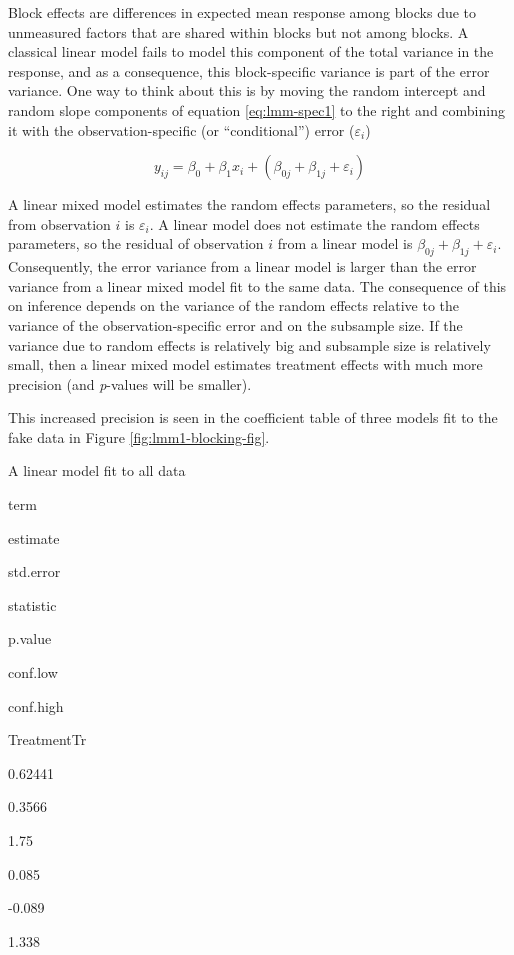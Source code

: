 \documentclass[]{book}
\begin{document}
Block effects are differences in expected mean response among blocks due to unmeasured factors that are shared within blocks but not among blocks. A classical linear model fails to model this component of the total variance in the response, and as a consequence, this block-specific variance is part of the error variance. One way to think about this is by moving the random intercept and random slope components of equation \eqref{eq:lmm-spec1} to the right and combining it with the observation-specific (or ``conditional'') error (\(\varepsilon_i\))

\begin{equation}
y_{ij} = \beta_{0} + \beta_{1} x_i + (\beta_{0j} + \beta_{1j} + \varepsilon_i)
\label{eq:lmm-spec1b}
\end{equation}

A linear mixed model estimates the random effects parameters, so the residual from observation \(i\) is \(\varepsilon_i\). A linear model does not estimate the random effects parameters, so the residual of observation \(i\) from a linear model is \(\beta_{0j} + \beta_{1j} + \varepsilon_i\). Consequently, the error variance from a linear model is larger than the error variance from a linear mixed model fit to the same data. The consequence of this on inference depends on the variance of the random effects relative to the variance of the observation-specific error and on the subsample size. If the variance due to random effects is relatively big and subsample size is relatively small, then a linear mixed model estimates treatment effects with much more precision (and \emph{p}-values will be smaller).

This increased precision is seen in the coefficient table of three models fit to the fake data in Figure \ref{fig:lmm1-blocking-fig}.

A linear model fit to all data

term

estimate

std.error

statistic

p.value

conf.low

conf.high

TreatmentTr

0.62441

0.3566

1.75

0.085

-0.089

1.338
\end{document}
